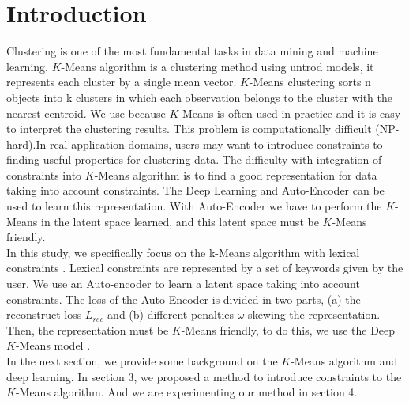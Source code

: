 \section{Introduction}\label{sec:intro}

Clustering is one of the most fundamental tasks in data mining and machine
learning. $K$-Means algorithm is a clustering method using untrod models,
it represents each cluster by a single mean vector. $K$-Means clustering sorts
n objects into k clusters in which each observation belongs to
the cluster with the nearest centroid.
We use because $K$-Means is often used in practice and it is easy to interpret 
the clustering results.
This problem is computationally
difficult (NP-hard).In real application domains, users may want to introduce 
constraints to finding 
useful properties for clustering data. The difficulty with integration of 
constraints into $K$-Means algorithm is to find a good representation for data 
taking into account constraints. The Deep Learning and Auto-Encoder can be used 
to learn this representation. With Auto-Encoder we have to perform the $K$-Means
in the latent space learned, and this latent space must be $K$-Means friendly.
\\In this study, we specifically focus on the k-Means algorithm with lexical constraints . Lexical constraints are represented
by a set of keywords given by the user. We use an Auto-encoder to learn a latent space taking
into account constraints. The loss of the Auto-Encoder is divided in two parts, (a) 
the reconstruct loss $L_{rec}$ and (b) different penalties $\omega$ skewing the
representation. Then, the representation must be $K$-Means friendly, 
to do this, we use the Deep $K$-Means model \cite{Deap-K-Means}.  
\\In the next section, we provide some background on the $K$-Means algorithm and
deep learning. In section 3, we proposed a method to introduce constraints to 
the $K$-Means algorithm. And we are experimenting our method in section 4.
